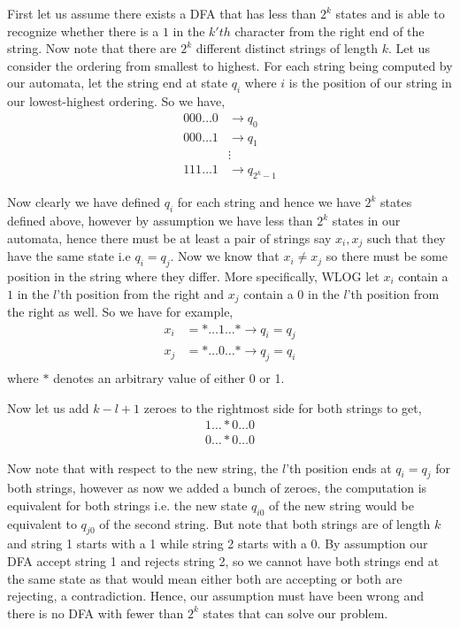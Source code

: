 \documentclass[11pt]{article}
\begin{document}
\begin{enumerate}
    \begin{answer}
        First let us assume there exists a DFA that has less than $2^{k}$ states and is able to recognize whether there is a $1$ in the $k'th$ character from the right end of the string. Now note that there are $2^{k}$ different distinct strings of length $k$. Let us consider the ordering from smallest to highest. For each string being computed by our automata, let the string end at state $q_i$ where $i$ is the position of our string in our lowest-highest ordering. So we have,
        \begin{align*}
            000\dots0 &\to q_{0}\\
            000\dots1 &\to q_{1}\\
                      &\vdots\\
            111\dots1& \to q_{2^{k} - 1}
        \end{align*}

        Now clearly we have defined $q_i$ for each string and hence we have  $2^{k}$ states defined above, however by assumption we have less than $2^{k}$ states in our automata, hence there must be at least a pair of strings say $x_i, x_j$ such that they have the same state i.e $q_i = q_j$. Now we know that $x_i \ne x_j$ so there must be some position in the string where they differ. More specifically, WLOG let $x_i$ contain a $1$ in the $l$'th position from the right and $x_j$ contain a $0$ in the $l$'th position from the right as well. So we have for example,
        \begin{align*}
            x_i &= *\dots 1 \dots * \to q_i = q_j\\
            x_j &= * \dots 0 \dots * \to q_j = q_i\\
        \end{align*}
        where $*$ denotes an arbitrary value of either 0 or 1.

        Now let us add $k - l + 1$ zeroes to the rightmost side for both strings to get,
        \begin{align*}
            1 \dots * 0 \dots 0\\
            0 \dots * 0 \dots 0
        \end{align*}

        Now note that with respect to the new string, the $l$'th position ends at $q_i = q_j$ for both strings, however as now we added a bunch of zeroes, the computation is equivalent for both strings i.e. the new state $q_{i0}$ of the new string would be equivalent to $q_{j0}$ of the second string. But note that both strings are of length $k$ and string 1 starts with a 1 while string 2 starts with a 0. By assumption our DFA accept string 1 and rejects string 2, so we cannot have both strings end at the same state as that would mean either both are accepting or both are rejecting, a contradiction. Hence, our assumption must have been wrong and there is no DFA with fewer than $2^{k}$ states that can solve our problem.


    \end{answer}
    

\end{enumerate}
\end{document}
